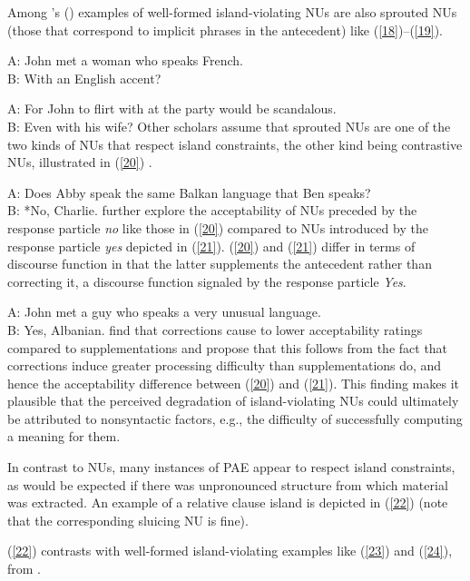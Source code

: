 \documentclass[output=paper
	        ,collection
	        ,collectionchapter
 	        ,biblatex
                ,babelshorthands
                ,newtxmath
                ,draftmode
                ,colorlinks, citecolor=brown
]{langscibook}
\begin{document}
{Among \citeauthor{CJ2005a}'s (\citeyear[245]{CJ2005a}) examples of well-formed island-violating NUs are also sprouted NUs (those that correspond to implicit phrases in the antecedent) like (\ref{18})--(\ref{19}).

\ea A: John met a woman who speaks French.\\B: With an English accent?\label{18}\z

\ea A: For John to flirt with at the party would be scandalous. \\B: Even with his wife?\label{19}\z
Other scholars assume that sprouted NUs are one of the two kinds of NUs that respect island constraints, the other kind being contrastive NUs, illustrated in (\ref{20}) \citep{Chung1995, Merchant2001, Griffiths2014}.

\ea A: Does Abby speak the same Balkan language that Ben speaks?\\
B: *No, Charlie. \citep{Merchant2001}  \label{20}\z
%
\citet{Schmeh2015} further explore the acceptability of NUs preceded by the response particle \textit{no} like those in (\ref{20}) compared to NUs introduced by the response particle \textit{yes} depicted in (\ref{21}). (\ref{20}) and (\ref{21}) differ in terms of discourse function in that the latter supplements the antecedent rather than correcting it, a discourse function signaled by the response particle \textit{Yes}.

\ea A: John met a guy who speaks a very unusual language. \\B: Yes, Albanian. \citep[245]{CJ2005a} \label{21}\z
%
\citet{Schmeh2015} find that corrections cause to
lower acceptability ratings compared to supplementations and propose that this follows from the fact that corrections induce greater processing difficulty than supplementations do, and hence the acceptability difference between (\ref{20}) and (\ref{21}). This finding makes it plausible that the perceived degradation of island-violating NUs could ultimately be attributed to nonsyntactic factors, e.g., the difficulty of successfully computing a meaning for them.

In contrast to NUs, many instances of PAE appear to respect island constraints, as would be expected if there was unpronounced structure from which material was extracted. An example of a relative clause island is depicted in (\ref{22}) (note that the corresponding sluicing NU is fine).

\z
(\ref{22}) contrasts with well-formed island-violating examples like (\ref{23}) and (\ref{24}), from \citet{Ginzburg2018}.

}
\end{document}
